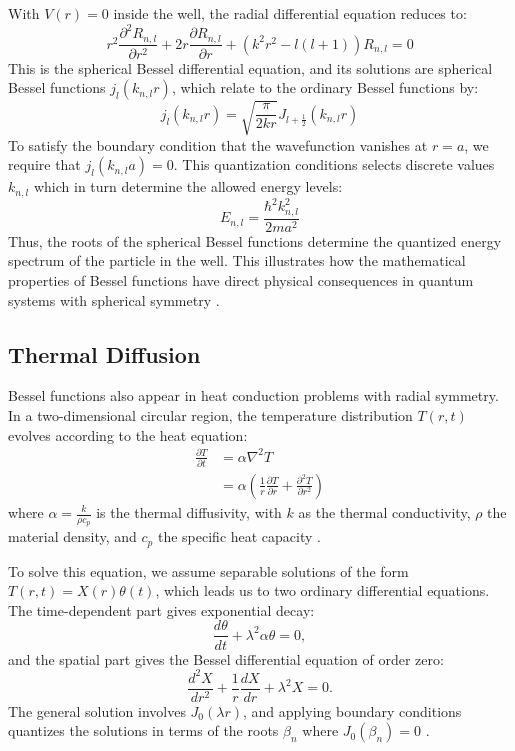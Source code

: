 \documentclass[linenumbers, twocolumn]{aastex631}
\begin{document}
\noindent With $V(r)=0$ inside the well, the radial differential equation
reduces to:
\begin{equation}
    r^2\frac{\partial^2 R_{n,l}}{\partial r^2} + 2r\frac{\partial R_{n,l}}{\partial r} +(k^2r^2-l(l+1))R_{n,l}=0
\end{equation}
\noindent This is the spherical Bessel differential equation, and its solutions
are spherical Bessel functions $j_l(k_{n,l}r)$, which relate to the ordinary
Bessel functions by:
\begin{equation}
    j_l(k_{n,l}r)=\sqrt{\frac{\pi}{2kr}}J_{l+\frac{1}{2}}(k_{n,l}r)
\end{equation}
\noindent To satisfy the boundary condition that the wavefunction vanishes at
$r=a$, we require that $j_l(k_{n,l}a)=0$. This quantization conditions selects
discrete values $k_{n,l}$ which in turn determine the allowed energy levels:
\begin{equation}
    E_{n,l}=\frac{\hbar^2k_{n,l}^2}{2ma^2}
\end{equation}
\noindent Thus, the roots of the spherical Bessel functions determine the
quantized energy spectrum of the particle in the well. This illustrates how
the mathematical properties of Bessel functions have direct physical 
consequences in quantum systems with spherical symmetry \cite{weisstein}.\\


\subsection{Thermal Diffusion}

Bessel functions also appear in heat conduction problems with radial symmetry.
In a two-dimensional circular region, the temperature distribution $T(r,t)$
evolves according to the heat equation:
\begin{align}
    \frac{\partial T}{\partial t}&=\alpha\nabla^2T\\
    &=\alpha\left(\frac{1}{r} \frac{\partial T}{\partial r} + \frac{\partial^2 T}{\partial r^2}\right)
\end{align}
\noindent where  $\alpha=\frac{k}{\rho c_p}$ is the thermal diffusivity, with
$k$ as the thermal conductivity, $\rho$ the material density, and $c_p$ the
specific heat capacity \cite{hahn}.

\noindent To solve this equation, we assume separable solutions of the form
$T(r,t)=X(r)\theta(t)$, which leads us to two ordinary differential equations.
The time-dependent part gives exponential decay:
\begin{equation}
    \frac{d\theta}{dt}+\lambda^2\alpha\theta=0,
\end{equation}
\noindent and the spatial part gives the Bessel differential equation
of order zero:
\begin{equation}
    \frac{d^2X}{dr^2}+\frac{1}{r}\frac{dX}{dr}+\lambda^2X=0.
\end{equation}
\noindent The general solution involves $J_0(\lambda r)$, and applying boundary
conditions quantizes the solutions in terms of the roots $\beta_n$ where
$J_0(\beta_n)=0$ \cite{tsega}.
\end{document}

